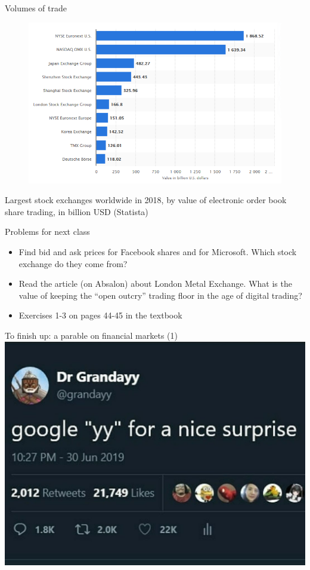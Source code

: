\begin{frame}{Volumes of trade}
\begin{figure}
	\includegraphics[width=.75\paperwidth]{pics/volumes2018}
\end{figure}
Largest stock exchanges worldwide in 2018, by value of electronic order book share trading, in billion USD (Statista)
\end{frame}


\begin{frame}{Problems for next class}
\begin{itemize}
	\item Find bid and ask prices for Facebook shares and for Microsoft. Which stock exchange do they come from? 
	\item Read the article (on Absalon) about London Metal Exchange. What is the value of keeping the ``open outcry'' trading floor in the age of digital trading?
	\item Exercises 1-3 on pages 44-45 in the textbook
\end{itemize}
\end{frame}


\begin{frame}{To finish up: a parable on financial markets (1)}
	\centering \includegraphics[width=0.6\paperwidth]{pics/yy1}
\end{frame}


